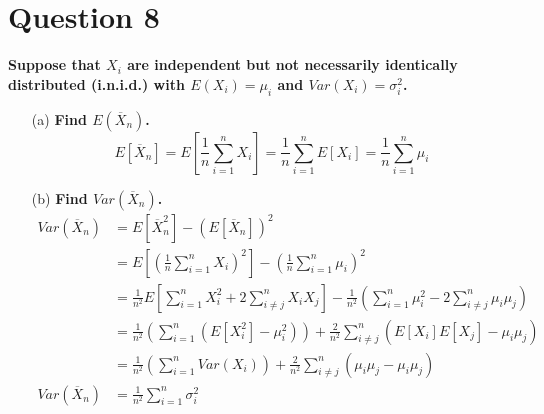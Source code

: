 \documentclass{article}
\newcommand{\olx}[1]{\overline{X}_{#1}}
\newcommand{\est}[1]{\frac{1}{#1}\sum_{i=1}^{#1}}
\begin{document}

\section*{Question 8}
\textbf{Suppose that $X_i$ are independent but not necessarily identically distributed (i.n.i.d.) with $E(X_i)=\mu_i$ and $Var(X_i)=\sigma_i^2$.}

\begin{itemize}
	\item[(a)] \textbf{Find $E(\overline{X}_n)$.} \\
	\[
		E[\olx{n}]=E\left[\est{n}X_i\right]=\frac{1}{n}\sum_{i=1}^nE[X_i]=\est{n}\mu_i
	\]
	
	\item[(b)] \textbf{Find $Var(\overline{X}_n)$.} \\
	\begin{align*}
		Var(\olx{n}) 	&= E\left[\olx{n}^2\right] - \left(E[\olx{n}]\right)^2	\\
						&= E\left[\left(\est{n}X_i\right)^2\right] - \left(\est{n}\mu_i\right)^2 \\
						&= \frac{1}{n^2}E\left[\sum_{i=1}^n X_i^2+2\sum_{i\neq j}^n X_iX_j\right]-\frac{1}{n^2}\left(\sum_{i=1}^n\mu_i^2-2\sum_{i\neq j}^n\mu_i\mu_j\right) \\
						&= \frac{1}{n^2}\left(\sum_{i=1}^n(E[X_i^2]-\mu_i^2)\right) + \frac{2}{n^2}\sum_{i\neq j}^n(E[X_i]E[X_j]- \mu_i\mu_j) \\
						&= \frac{1}{n^2}\left(\sum_{i=1}^nVar(X_i)\right) + \frac{2}{n^2}\sum_{i\neq j}^n(\mu_i\mu_j- \mu_i\mu_j) \\
		Var(\olx{n}) 	&= \frac{1}{n^2}\sum_{i=1}^n\sigma_i^2
	\end{align*}
	
\end{itemize}	

\pagebreak
\end{document}
